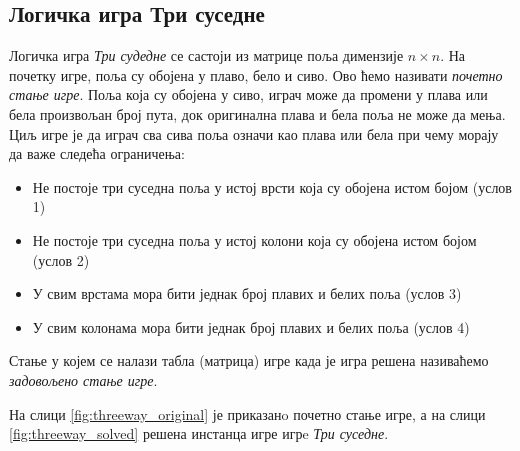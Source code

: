 \documentclass[a4paper]{article}
\begin{document}
\subsection{Логичка игра Три суседне}
Логичка игра \emph{Три судедне} се састоји из матрице поља димензије $n \times n$. На почетку игре,
поља су обојена у плаво, бело и сиво. Ово ћемо називати \emph{почетно стање игре}.
Поља која су обојена у сиво, играч може да промени у плава или бела произвољан број пута,
док оригинална плава и бела поља не може да мења. 
Циљ игре је да играч сва сива поља означи као плава или бела при чему морају да важе следећа ограничења:
\begin{itemize}
    \item Не постоје три суседна поља у истој врсти која су обојена истом бојом (услов 1)
    \item Не постоје три суседна поља у истој колони која су обојена истом бојом (услов 2)
    \item У свим врстама мора бити једнак број плавих и белих поља (услов 3)
    \item У свим колонама мора бити једнак број плавих и белих поља (услов 4)
\end{itemize}

Стање у којем се налази табла (матрица) игре када је игра решена називаћемо \emph{задовољено стање игре}.

На слици \ref{fig:threeway_original} је приказанo почетно стање игре, а на слици \ref{fig:threeway_solved} решена инстанца игре игрe \emph{Три суседне}.
\end{document}
